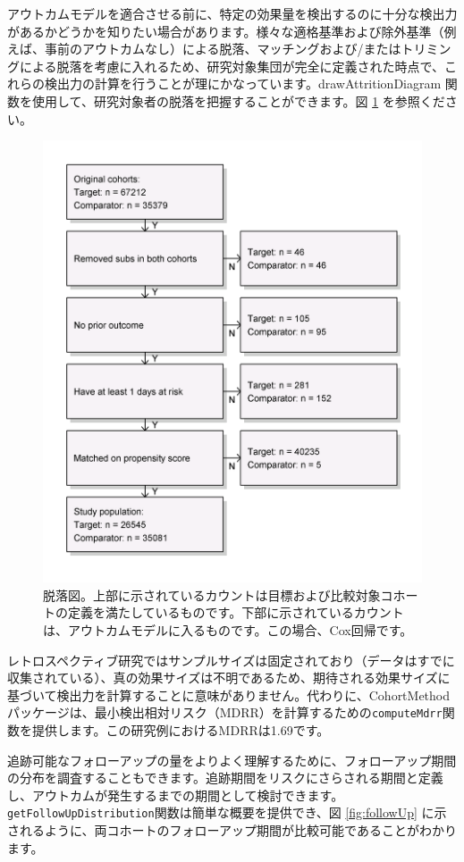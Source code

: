 \documentclass[
  11pt]{book}
\theoremstyle{definition}
\theoremstyle{definition}
\theoremstyle{definition}
\theoremstyle{definition}
\theoremstyle{remark}
\begin{document}
アウトカムモデルを適合させる前に、特定の効果量を検出するのに十分な検出力があるかどうかを知りたい場合があります。様々な適格基準および除外基準（例えば、事前のアウトカムなし）による脱落、マッチングおよび/またはトリミングによる脱落を考慮に入れるため、研究対象集団が完全に定義された時点で、これらの検出力の計算を行うことが理にかなっています。drawAttritionDiagram 関数を使用して、研究対象者の脱落を把握することができます。図 \ref{fig:attrition} を参照ください。 

\begin{figure}

{\centering \includegraphics[width=0.7\linewidth]{images/PopulationLevelEstimation/attrition} 

}

\caption{脱落図。上部に示されているカウントは目標および比較対象コホートの定義を満たしているものです。下部に示されているカウントは、アウトカムモデルに入るものです。この場合、Cox回帰です。}\label{fig:attrition}
\end{figure}

レトロスペクティブ研究ではサンプルサイズは固定されており（データはすでに収集されている）、真の効果サイズは不明であるため、期待される効果サイズに基づいて検出力を計算することに意味がありません。代わりに、CohortMethodパッケージは、最小検出相対リスク（MDRR）を計算するための\texttt{computeMdrr}関数を提供します。この研究例におけるMDRRは1.69です。  

追跡可能なフォローアップの量をよりよく理解するために、フォローアップ期間の分布を調査することもできます。追跡期間をリスクにさらされる期間と定義し、アウトカムが発生するまでの期間として検討できます。\texttt{getFollowUpDistribution}関数は簡単な概要を提供でき、図 \ref{fig:followUp} に示されるように、両コホートのフォローアップ期間が比較可能であることがわかります。
\end{document}
